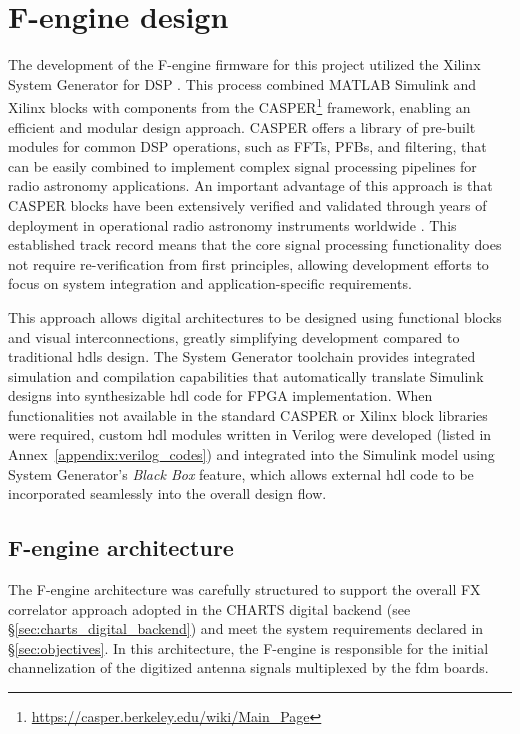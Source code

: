 \chapter{F-engine design}
\label{chap:fengine}

The development of the F-engine firmware for this project utilized the Xilinx System Generator for DSP \citep{Xilinx_UG948_2020}. This process combined MATLAB Simulink and Xilinx blocks with components from the CASPER\footnote{\url{https://casper.berkeley.edu/wiki/Main_Page}} framework, enabling an efficient and modular design approach. CASPER offers a library of pre-built modules for common DSP operations, such as FFTs, PFBs, and filtering, that can be easily combined to implement complex signal processing pipelines for radio astronomy applications. An important advantage of this approach is that CASPER blocks have been extensively verified and validated through years of deployment in operational radio astronomy instruments worldwide \citep{hickish2016decadedevelopingradioastronomyinstrumentation,Parsons_2008}. This established track record means that the core signal processing functionality does not require re-verification from first principles, allowing development efforts to focus on system integration and application-specific requirements.

This approach allows digital architectures to be designed using functional blocks and visual interconnections, greatly simplifying development compared to traditional \glspl{hdl} design. The System Generator toolchain provides integrated simulation and compilation capabilities that automatically translate Simulink designs into synthesizable \gls{hdl} code for FPGA implementation. When functionalities not available in the standard CASPER or Xilinx block libraries were required, custom \gls{hdl} modules written in Verilog were developed (listed in Annex~\ref{appendix:verilog_codes}) and integrated into the Simulink model using System Generator's \textit{Black Box} feature, which allows external \gls{hdl} code to be incorporated seamlessly into the overall design flow.

\section{F-engine architecture}
\label{sec:f_engine_architecture}
The F-engine architecture was carefully structured to support the overall FX correlator approach adopted in the CHARTS digital backend (see \S\ref{sec:charts_digital_backend}) and meet the system requirements declared in \S\ref{sec:objectives}. In this architecture, the F-engine is responsible for the initial channelization of the digitized antenna signals multiplexed by the \gls{fdm} boards.

